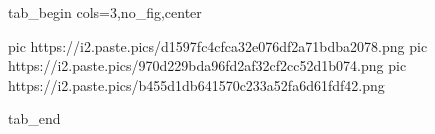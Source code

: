  
 
 
 
 


\ifcmt
  tab_begin cols=3,no_fig,center

     pic https://i2.paste.pics/d1597fc4cfca32e076df2a71bdba2078.png
		 pic https://i2.paste.pics/970d229bda96fd2af32cf2cc52d1b074.png
		 pic https://i2.paste.pics/b455d1db641570c233a52fa6d61fdf42.png

  tab_end
\fi

